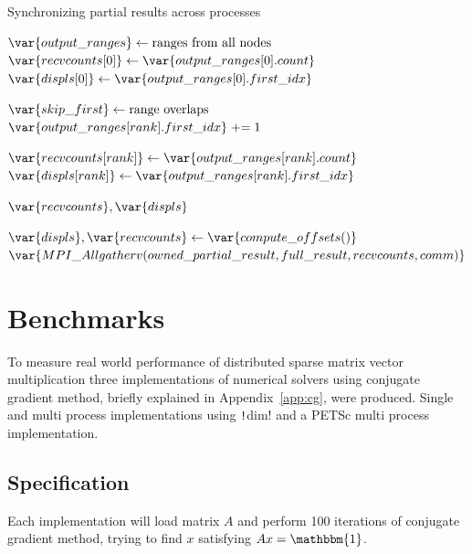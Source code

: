 \documentclass[thesis=M,english]{FITthesis}[2019/12/23]
\newcommand{\csre}[1]{\texttt!#1!}
\begin{document}
\newcommand{\pluseq}{\mathrel{+}=}
\begin{algorithm}[htp]
    \caption{Synchronizing partial results across processes}
    \begin{algorithmic}
        \State $\var{output\_ranges} \gets \text{ranges from all nodes}$
        \State $\var{recvcounts[0]} \gets \var{output\_ranges[0].count}$
        \State $\var{displs[0]} \gets \var{output\_ranges[0].first\_idx}$


        \State $\var{skip\_first} \gets \text{range overlaps}$
        \State $\var{output\_ranges[rank].first\_idx} \pluseq 1$
        \EndIf

        \State $\var{recvcounts[rank]} \gets \var{output\_ranges[rank].count}$
        \State $\var{displs[rank]} \gets \var{output\_ranges[rank].first\_idx}$

        \EndFor

        \Return $\var{recvcounts}, \var{displs}$

        \EndFunction

        \State $\var{displs}, \var{recvcounts} \gets \var{compute\_offsets()}$
        \State $\var{MPI\_Allgatherv(owned\_partial\_result, full\_result, recvcounts, comm)}$

        \EndFunction
    \end{algorithmic}
\end{algorithm}


\chapter{Benchmarks}

To measure real world performance of distributed sparse matrix vector multiplication
three implementations of numerical solvers using conjugate gradient method, briefly explained in
Appendix~\ref{app:cg}, were produced.
Single and multi process implementations using \csre{dim} and a PETSc multi process implementation.

\section{Specification}

Each implementation will load matrix $A$ and perform 100 iterations of conjugate
gradient method, trying to find $x$ satisfying $Ax=\mathbbm{1}$.
\end{document}
